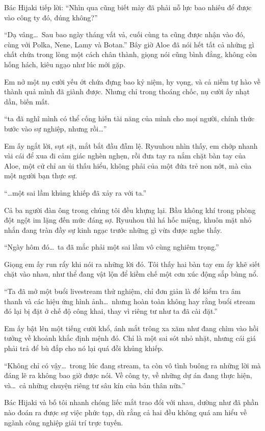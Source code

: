 \documentclass[../main.tex]{subfiles}
\begin{document}
Bác Hijaki tiếp lời: ``Nhìn qua cũng biết mày đã phải nỗ lực bao nhiêu để được vào công ty đó, đúng không?''

``Dạ vâng\dots\ Sau bao ngày tháng vất vả, cuối cùng ta cũng được nhận vào đó, cùng với Polka, Nene, Lamy và Botan.'' Bây giờ Aloe đã nói hết tất cả những gì chất chứa trong lòng một cách chân thành, giọng nói cũng bình đẳng, không còn hống hách, kiêu ngạo như lúc mới gặp.

Em nở một nụ cười yếu ớt chứa đựng bao kỷ niệm, hy vọng, và cả niềm tự hào về thành quả mình đã giành được. Nhưng chỉ trong thoáng chốc, nụ cười ấy nhạt dần, biến mất.

``ta đã nghĩ mình có thể cống hiến tài năng của mình cho mọi người, chính thức bước vào sự nghiệp, nhưng rồi\dots''

Em ấy ngắt lời, sụt sịt, mắt bắt đầu đẫm lệ. Ryuuhou nhìn thấy, em chớp nhanh vài cái để xua đi cảm giác nghèn nghẹn, rồi đưa tay ra nắm chặt bàn tay của Aloe, một cử chỉ an ủi thấu hiểu, không phải của một đứa trẻ non nớt, mà của một người bạn thực sự.

``\dots một sai lầm khủng khiếp đã xảy ra với ta.''

Cả ba người đàn ông trong chúng tôi đều khựng lại. Bầu không khí trong phòng đột ngột im lặng đến mức đáng sợ. Ryuuhou thì há hốc miệng, khuôn mặt nhỏ nhắn đang tràn đầy sự kinh ngạc trước những gì vừa được nghe thấy.

``Ngày hôm đó\dots\ ta đã mắc phải một sai lầm vô cùng nghiêm trọng.''

Giọng em ấy run rẩy khi nói ra những lời đó. Tôi thấy hai bàn tay em ấy khẽ siết chặt vào nhau, như thể đang vật lộn để kiềm chế một cơn xúc động sắp bùng nổ.

``Ta đã mở một buổi livestream thử nghiệm, chỉ đơn giản là để kiểm tra âm thanh và các hiệu ứng hình ảnh\dots\ nhưng hoàn toàn không hay rằng buổi stream đó lại bị đặt ở chế độ công khai, thay vì riêng tư như ta đã cài đặt.''

Em ấy bật lên một tiếng cười khổ, ánh mắt trông xa xăm như đang chìm vào hồi tưởng về khoảnh khắc định mệnh đó. Chỉ là một sai sót nhỏ nhặt, nhưng cái giá phải trả để bù đắp cho nó lại quá đỗi khủng khiếp.

``Không chỉ có vậy\dots\ trong lúc đang stream, ta còn vô tình buông ra những lời mà đáng lẽ ra không bao giờ được nói. Về công ty, về những dự án đang thực hiện, và\dots\ cả những chuyện riêng tư sâu kín của bản thân nữa.''

Bác Hijaki và bố tôi nhanh chóng liếc mắt trao đổi với nhau, dường như đã phần nào đoán ra được sự việc phức tạp, dù rằng cả hai đều không quá am hiểu về ngành công nghiệp giải trí trực tuyến.
\end{document}
